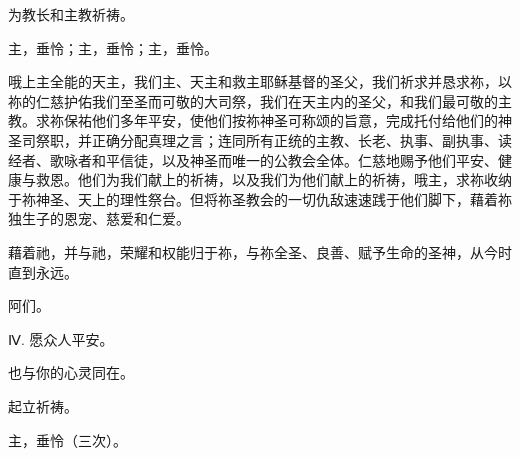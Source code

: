 \par

为教长和主教祈祷。\par

\par

主，垂怜；主，垂怜；主，垂怜。\par

\par

哦上主全能的天主，我们主、天主和救主耶稣基督的圣父，我们祈求并恳求祢，以祢的仁慈护佑我们至圣而可敬的大司祭，我们在天主内的圣父，和我们最可敬的主教。求祢保祐他们多年平安，使他们按祢神圣可称颂的旨意，完成托付给他们的神圣司祭职，并正确分配真理之言；连同所有正统的主教、长老、执事、副执事、读经者、歌咏者和平信徒，以及神圣而唯一的公教会全体。仁慈地赐予他们平安、健康与救恩。他们为我们献上的祈祷，以及我们为他们献上的祈祷，哦主，求祢收纳于祢神圣、天上的理性祭台。但将祢圣教会的一切仇敌速速践于他们脚下，藉着祢独生子的恩宠、慈爱和仁爱。\par

\par

藉着祂，并与祂，荣耀和权能归于祢，与祢全圣、良善、赋予生命的圣神，从今时直到永远。\par

\par

阿们。\par

\par

Ⅳ. 愿众人平安。\par

\par

也与你的心灵同在。\par

\par

起立祈祷。\par

\par

主，垂怜（三次）。\par

\par

\par


